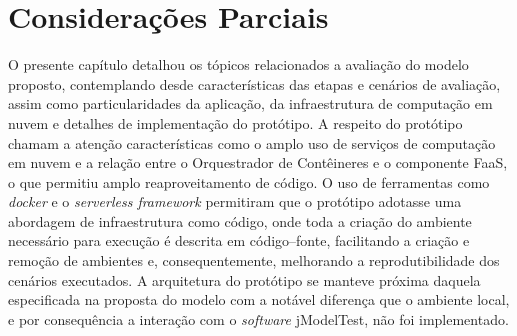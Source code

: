 \documentclass[english,brazilian]{UNISINOSmonografia} %
\begin{document}
\section{Considerações Parciais}




O presente capítulo detalhou os tópicos relacionados a avaliação do modelo proposto, contemplando desde características das etapas e cenários de avaliação, assim como particularidades da aplicação, da infraestrutura de computação em nuvem e detalhes de implementação do protótipo.
%
A respeito do protótipo chamam a atenção características como o amplo uso de serviços de computação em nuvem e a relação entre o Orquestrador de Contêineres e o componente FaaS, o que permitiu amplo reaproveitamento de código.
%
O uso de ferramentas como \textit{docker} e o \textit{serverless framework} permitiram que o protótipo adotasse uma abordagem de infraestrutura como código, onde toda a criação do ambiente necessário para execução é descrita em código--fonte, facilitando a criação e remoção de ambientes e, consequentemente, melhorando a reprodutibilidade dos cenários executados.
%
A arquitetura do protótipo se manteve próxima daquela especificada na proposta do modelo com a notável diferença que o ambiente local, e por consequência a interação com o \textit{software} jModelTest, não foi implementado.
\end{document}
